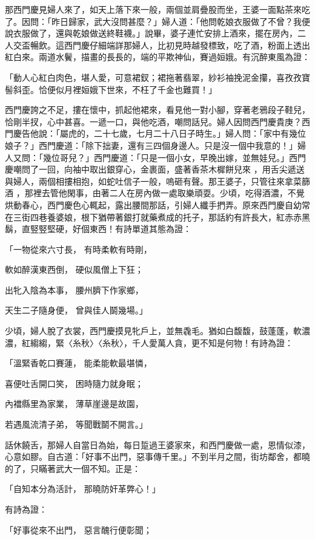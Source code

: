 \begin{showcontents}{}
那西門慶見婦人來了，如天上落下來一般，兩個並肩疊股而坐，王婆一面點茶來吃了。因問：「昨日歸家，武大沒問甚麼？」婦人道：「他問乾娘衣服做了不曾？我便說衣服做了，還與乾娘做送終鞋襪。」說畢，婆子連忙安排上酒來，擺在房內，二人交盃暢飲。這西門慶仔細端詳那婦人，比初見時越發標致，吃了酒，粉面上透出紅白來。兩道水鬢，描畫的長長的，端的平欺神仙，賽過姮娥。有沉醉東風為證：

「動人心紅白肉色，堪人愛，可意裙釵；裙拖著翡翠，紗衫袖挽泥金攥，喜孜孜寶髻斜歪。恰便似月裡姮娥下世來，不枉了千金也難買！」

西門慶誇之不足，摟在懷中，抓起他裙來，看見他一對小腳，穿著老鴉段子鞋兒，恰剛半扠，心中甚喜。一遞一口，與他吃酒，嘲問話兒。婦人因問西門慶貴庚？西門慶告他說：「屬虎的，二十七歲，七月二十八日子時生。」婦人問：「家中有幾位娘子？」西門慶道：「除下拙妻，還有三四個身邊人。只是沒一個中我意的！」婦人又問：「幾位哥兒？」西門慶道：「只是一個小女，早晚出嫁，並無娃兒。」西門慶嘲問了一回，向袖中取出銀穿心，金裹面，盛著香茶木樨餅兒來 ，用舌尖遞送與婦人，兩個相摟相抱，如蛇吐信子一般，嗚砸有聲。那王婆子，只管往來拿菜篩酒 ，那裡去管他閑事，由著二人在房內做一處取樂頑耍。少頃，吃得酒濃，不覺烘動春心，西門慶色心輒起，露出腰間那話，引婦人纖手捫弄。原來西門慶自幼常在三街四巷養婆娘，根下猶帶著銀打就藥煮成的托子，那話約有許長大，紅赤赤黑鬍，直竪竪堅硬，好個東西！有詩單道其態為證：

「一物從來六寸長，  有時柔軟有時剛，

軟如醉漢東西倒，  硬似風僧上下狂；

出牝入陰為本事，  腰州臍下作家鄉，

天生二子隨身便，  曾與佳人鬬幾場。」

少頃，婦人脫了衣裳，西門慶摸見牝戶上，並無毳毛。猶如白馥馥，鼓蓬蓬，軟濃濃，紅縐縐，緊〈糸秋〉〈糸秋〉，千人愛萬人貪，更不知是何物！有詩為證：

「溫緊香乾口賽蓮，  能柔能軟最堪憐，

喜便吐舌開口笑，  困時隨力就身眠；

內襠縣里為家業，  薄草崖邊是故園，

若遇風流清子弟，  等聞戰鬬不開言。」

話休饒舌，那婦人自當日為始，每日踅過王婆家來，和西門慶做一處，恩情似漆，心意如膠。自古道：「好事不出門，惡事傳千里。」不到半月之間，街坊鄰舍，都曉的了，只瞞著武大一個不知。正是：

「自知本分為活計，  那曉防奸革弊心！」

有詩為證：

「好事從來不出門，  惡言醜行便彰聞；


\end{showcontents}
